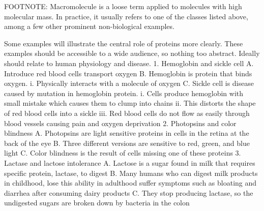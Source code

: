 FOOTNOTE: Macromolecule is a loose term applied to molecules with high molecular mass. In practice, it usually refers to one of the classes listed above, among a few other prominent non-biological examples.

Some examples will illustrate the central role of proteins more clearly.
These examples should be accessible to a wide audience, so nothing too abstract. Ideally should relate to human physiology and disease.
    1. Hemoglobin and sickle cell
        A. Introduce red blood cells transport oxygen
        B. Hemoglobin is protein that binds oxygen.
            i. Physically interacts with a molecule of oxygen
        C. Sickle cell is disease caused by mutation in hemoglobin protein.
            i. Cells produce hemoglobin with small mistake which causes them to clump into chains
            ii. This distorts the shape of red blood cells into a sickle
            iii. Red blood cells do not flow as easily through blood vessels causing pain and oxygen deprivation
    2. Photopsins and color blindness
        A. Photopsins are light sensitive proteins in cells in the retina at the back of the eye
        B. Three different versions are sensitive to red, green, and blue light
        C. Color blindness is the result of cells missing one of these proteins
    3. Lactase and lactose intolerance
        A. Lactose is a sugar found in milk that requires specific protein, lactase, to digest
        B. Many humans who can digest milk products in childhood, lose this ability in adulthood suffer symptoms such as bloating and diarrhea after consuming dairy products
        C. They stop producing lactase, so the undigested sugars are broken down by bacteria in the colon

